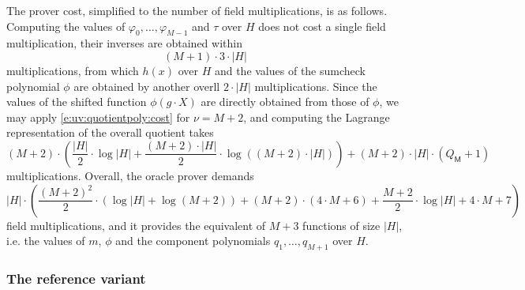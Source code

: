 \documentclass[11pt]{article}
\theoremstyle{definition}
\theoremstyle{definition}
\begin{document}
The prover cost, simplified to the number of field multiplications, is as follows.
Computing the values of $\varphi_0, \ldots, \varphi_{M-1}$ and $\tau$ over $H$ does not cost a single field multiplication, their inverses are obtained within
\[
(M+1)\cdot 3\cdot |H| 
\]
multiplications, from which $h(x)$ over $H$ and the values of the sumcheck polynomial $\phi$ are obtained by another overll $2\cdot |H|$ multiplications.
Since the values of the shifted function $\phi(g\cdot X)$ are directly obtained from those of $\phi$, we may apply 
\eqref{e:uv:quotientpoly:cost} for $\nu = M + 2$, and computing the Lagrange representation of the overall quotient takes
\[
(M + 2) \cdot \left(\frac{|H|}{2}\cdot \log|H| + \frac{(M+2)\cdot |H|}{2} \cdot\log((M+2)\cdot|H|) \right) + (M+2)\cdot |H|\cdot (Q_\mathsf M + 1)
\]
multiplications.
Overall, the oracle prover demands
\begin{equation}
 |H| \cdot\left(\frac{(M + 2)^2}{2}\cdot (\log|H| + \log (M+2)) +  (M + 2)\cdot(4\cdot M+6) + \frac{M+2}{2} \cdot \log |H| + 4\cdot M + 7   \right)
\end{equation}
field multiplications, and it provides the equivalent of $M + 3$ functions of size $|H|$, i.e. the values of $m$, $\phi$  and the component polynomials $q_1, \ldots, q_{M+1}$ over $H$.


\subsubsection{The reference variant}

%
%
% 
\end{document}
